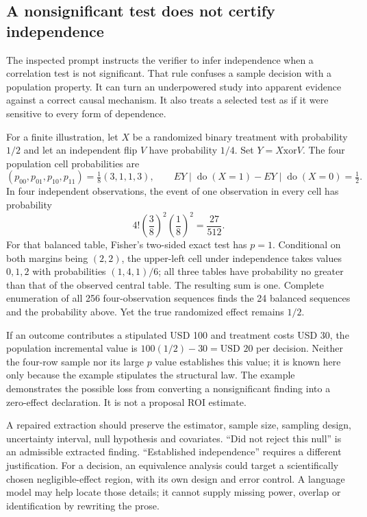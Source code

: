 \subsection{A nonsignificant test does not certify independence}

The inspected prompt instructs the verifier to infer independence when a
correlation test is not significant. That rule confuses a sample decision
with a population property. It can turn an underpowered study into apparent
evidence against a correct causal mechanism. It also treats a selected test
as if it were sensitive to every form of dependence.
\citep{exec17_benchmark_consistency}

For a finite illustration, let $X$ be a randomized binary treatment with
probability $1/2$ and let an independent flip $V$ have probability $1/4$.
Set $Y=X\mathbin{\mathrm{xor}}V$. The four population cell probabilities are
\begin{equation}
 (p_{00},p_{01},p_{10},p_{11})=\tfrac18(3,1,1,3),
 \qquad E{Y\mid\operatorname{do}(X=1)}
       -E{Y\mid\operatorname{do}(X=0)}=\tfrac12.
\label{exec17:validity-binary}
\end{equation}
In four independent observations, the event of one observation in every cell
has probability
\begin{equation}
 4!\left(\frac38\right)^2\left(\frac18\right)^2
       =\frac{27}{512}.
\label{exec17:validity-balanced}
\end{equation}
For that balanced table, Fisher's two-sided exact test has $p=1$. Conditional
on both margins being $(2,2)$, the upper-left cell under independence takes
values $0,1,2$ with probabilities $(1,4,1)/6$; all three tables have probability
no greater than that of the observed central table. The resulting sum is one.
Complete enumeration of all 256 four-observation sequences finds the 24
balanced sequences and the probability above. Yet the true randomized effect
remains $1/2$.\citep{exec17_advice_validity_exact}

If an outcome contributes a stipulated USD 100 and treatment costs USD 30, the
population incremental value is $100(1/2)-30=\text{USD }20$ per decision.
Neither the four-row sample nor its large $p$ value establishes this value; it
is known here only because the example stipulates the structural law. The
example demonstrates the possible loss from converting a nonsignificant
finding into a zero-effect declaration. It is not a proposal ROI estimate.

A repaired extraction should preserve the estimator, sample size, sampling
design, uncertainty interval, null hypothesis and covariates. ``Did not reject
this null'' is an admissible extracted finding. ``Established independence''
requires a different justification. For a decision, an equivalence analysis
could target a scientifically chosen negligible-effect region, with its own
design and error control. A language model may help locate those details; it
cannot supply missing power, overlap or identification by rewriting the prose.

